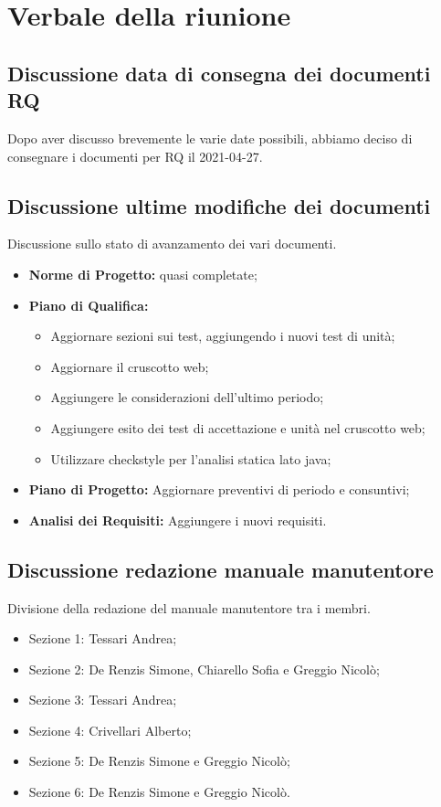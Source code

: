 \section{Verbale della riunione}
\subsection{Discussione data di consegna dei documenti RQ}
Dopo aver discusso brevemente le varie date possibili, abbiamo deciso di consegnare i documenti per RQ il 2021-04-27.
\subsection{Discussione ultime modifiche dei documenti}
Discussione sullo stato di avanzamento dei vari documenti.
\begin{itemize}
	\item {\textbf{Norme di Progetto:}} quasi completate;
	\item {\textbf{Piano di Qualifica:}} 
		\begin{itemize}
			\item Aggiornare sezioni sui test, aggiungendo i nuovi test di unità;
			\item Aggiornare il cruscotto web;
			\item Aggiungere le considerazioni dell'ultimo periodo;
			\item Aggiungere esito dei test di accettazione e unità nel cruscotto web;
			\item Utilizzare checkstyle per l'analisi statica lato java;
		\end{itemize} 
	\item {\textbf{Piano di Progetto:}} Aggiornare preventivi di periodo e consuntivi;
	\item {\textbf{Analisi dei Requisiti:}} Aggiungere i nuovi requisiti.
\end{itemize}
\subsection{Discussione redazione manuale manutentore}
Divisione della redazione del manuale manutentore tra i membri.
\begin{itemize}
	\item {Sezione 1:} Tessari Andrea;
	\item {Sezione 2:} De Renzis Simone, Chiarello Sofia e Greggio Nicolò;
	\item {Sezione 3:} Tessari Andrea;
	\item {Sezione 4:} Crivellari Alberto;
	\item {Sezione 5:} De Renzis Simone e Greggio Nicolò;
	\item {Sezione 6:} De Renzis Simone e Greggio Nicolò.
\end{itemize}
\pagebreak

